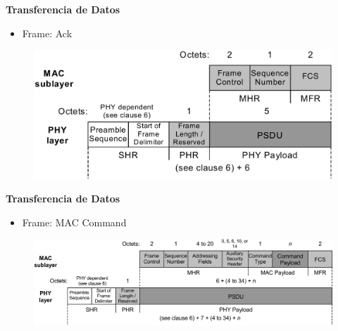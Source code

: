 \documentclass[aspectratio=169]{beamer}
\begin{document}
\begin{frame}{\textbf{Transferencia de Datos}}
\begin{minipage}[c]{1.0\linewidth}
	\begin{minipage}[c]{0.6\linewidth}
		\begin{itemize}
			\item Frame: Ack
			\vspace{10px}
	  	\end{itemize}	
	\end{minipage}
	\begin{minipage}[c]{0.35\linewidth}
		\begin{figure}[H]
			\includegraphics[width=1\textwidth]{./imagenes/ack.jpg}
		\end{figure}	  	  	
	\end{minipage}
\end{minipage}
\end{frame}

\begin{frame}{\textbf{Transferencia de Datos}}
\begin{minipage}[c]{1.0\linewidth}
	\begin{minipage}[c]{0.6\linewidth}
		\begin{itemize}
			\item Frame: MAC Command
			\vspace{10px}
	  	\end{itemize}	
	\end{minipage}
	\begin{minipage}[c]{0.35\linewidth}
		\begin{figure}[H]
			\includegraphics[width=1\textwidth]{./imagenes/maccommand.jpg}
		\end{figure}	  	  	
	\end{minipage}
\end{minipage}
\end{frame}
\end{document}
